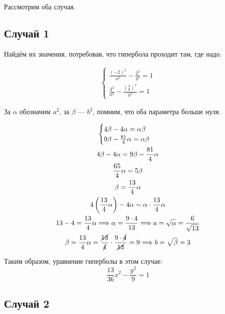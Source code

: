 \documentclass[12pt, a4paper]{article}
\begin{document}
    Рассмотрим оба случая.

    \subsection{Случай 1}

    Найдём их значения, потребовав, что гипербола проходит там, где надо.

    \begin{gather}
        \begin{cases}
            \frac{(-2)^2}{a^2} - \frac{2^2}{b^2} = 1 \\
            \frac{3^2}{a^2} - \frac{\left(\frac{9}{2}\right)^2}{b^2} = 1
        \end{cases}
    \end{gather}

    За $\alpha$ обозначим $a^2$, за $\beta$ — $b^2$, помним, что оба параметра больше нуля.

    \begin{gather}
        \begin{cases}
            4\beta - 4\alpha = \alpha\beta \\
            9\beta - \frac{81}{4} \alpha = \alpha\beta
        \end{cases} \\
        4\beta - 4\alpha = 9\beta - \frac{81}{4} \alpha \\
        \frac{65}{4}\alpha = 5\beta \\
        \beta = \frac{13}{4}\alpha \\
        4 \left( \frac{13}{4}\alpha \right) - 4\alpha = \alpha \cdot \frac{13}{4}\alpha \\
        13 - 4 = \frac{13}{4}\alpha \Longrightarrow \alpha = \frac{9 \cdot 4}{13} \Longrightarrow a = \sqrt{\alpha} = \frac{6}{\sqrt{13}} \\
        \beta = \frac{13}{4}\alpha = \frac{\cancel{13}}{\cancel{4}} \cdot \frac{9 \cdot \cancel{4}}{\cancel{13}} = 9 \Longrightarrow b = \sqrt{\beta} = 3
    \end{gather}

    Таким образом, уравнение гиперболы в этом случае:
    \begin{equation}
        \frac{13}{36} x^2 - \frac{y^2}{9} = 1
    \end{equation}


    \subsection{Случай 2}
\end{document}
